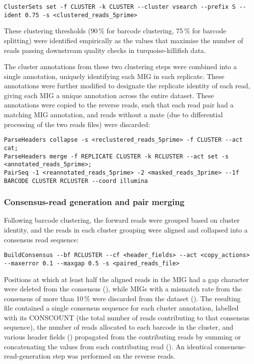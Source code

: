 \begin{lstlisting}
ClusterSets set -f CLUSTER -k CLUSTER --cluster vsearch --prefix S --ident 0.75 -s <clustered_reads_5prime>
\end{lstlisting}

\noindent These clustering thresholds (90\,\% for barcode clustering, 75\,\% for barcode splitting) were identified empirically as the values that maximise the number of reads passing downstream quality checks in turquoise-killifish data.

The cluster annotations from these two clustering steps were combined into a single annotation, uniquely identifying each MIG in each replicate. These annotations were further modified to designate the replicate identity of each read, giving each MIG a unique annotation across the entire dataset. These annotations were copied to the reverse reads, such that each read pair had a matching MIG annotation, and reads without a mate (due to differential processing of the two reads files) were discarded:

\begin{lstlisting}
ParseHeaders collapse -s <reclustered_reads_5prime> -f CLUSTER --act cat;
ParseHeaders merge -f REPLICATE CLUSTER -k RCLUSTER --act set -s <annotated_reads_5prime>;
PairSeq -1 <reannotated_reads_5prime> -2 <masked_reads_3prime> --1f BARCODE CLUSTER RCLUSTER --coord illumina
\end{lstlisting}

\subsubsection{Consensus-read generation and pair merging}
\label{sec:methods_comp_igpreproc_consensus}

Following barcode clustering, the \igseq forward reads were grouped based on cluster identity, and the reads in each cluster grouping were aligned and collapsed into a consensus read sequence:

\begin{lstlisting}
BuildConsensus --bf RCLUSTER --cf <header_fields> --act <copy_actions> --maxerror 0.1 --maxgap 0.5 -s <paired_reads_file>
\end{lstlisting}

\noindent Positions at which at least half the aligned reads in the MIG had a gap character were deleted from the consensus (), while MIGs with a mismatch rate from the consensus of more than 10\,\% were discarded from the dataset (). The resulting  file contained a single consensus sequence for each cluster annotation, labelled with its CONSCOUNT (the total number of reads contributing to that consensus sequence),  the number of reads allocated to each barcode in the cluster, and various header fields () propagated from the contributing reads by summing or concatenating the values from each contributing read (). An identical consensus-read-generation step was performed on the reverse reads.

